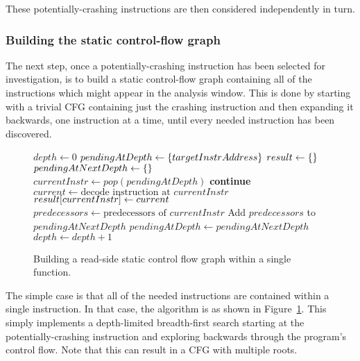 These potentially-crashing instructions are then considered
independently in turn.

\subsubsection{Building the static control-flow graph}
The next step, once a potentially-crashing instruction has been
selected for investigation, is to build a static control-flow graph
containing all of the instructions which might appear in the analysis
window.  This is done by starting with a trivial CFG containing just
the crashing instruction and then expanding it backwards, one
instruction at a time, until every needed instruction has been
discovered.

\begin{figure}
\begin{algorithmic}[1]
\State $depth \gets 0$
\State $pendingAtDepth \gets \{targetInstrAddress\}$
\State $result \gets \{\}$
  \State $pendingAtNextDepth \gets \{\}$
    \State $currentInstr \gets pop(pendingAtDepth)$
      \State \textbf{continue}
    \EndIf
    \State $current \gets \text{decode instruction at } currentInstr$
    \State $result[currentInstr] \gets current$
    \State $predecessors \gets \text{predecessors of } currentInstr$
    \State Add $predecessors$ to $pendingAtNextDepth$
  \EndWhile
  \State $pendingAtDepth \gets pendingAtNextDepth$
  \State $depth \gets depth + 1$
\EndWhile
\end{algorithmic}
\caption{Building a read-side static control flow graph within a
  single function. }
\label{fig:derive:static_read_cfg_single_function}
\end{figure}

The simple case is that all of the needed instructions are contained
within a single instruction.  In that case, the algorithm is as shown
in Figure~\ref{fig:derive:static_read_cfg_single_function}.  This
simply implements a depth-limited breadth-first search starting at the
potentially-crashing instruction and exploring backwards through the
program's control flow.  Note that this can result in a CFG with
multiple roots.


